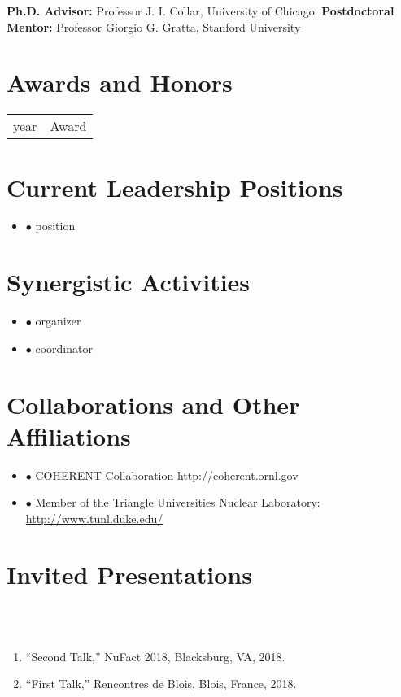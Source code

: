 \documentclass[overlapped,line,letterpaper]{res}
\begin{document}
\begin{resume}
\textbf{Ph.D. Advisor: } Professor J. I. Collar, University of Chicago.
\textbf{Postdoctoral Mentor:} Professor Giorgio G. Gratta, Stanford University


\section{\textbf{Awards and Honors}}
\begin{tabular}{p{1in}p{4.75in}}
year & Award\\
\end{tabular}

%
\section{\textbf{Current Leadership Positions}}
\begin{itemize}
\item $\bullet$  position
\end{itemize}

\section{\textbf{\normalsize Synergistic Activities}}
\begin{itemize}
\item $\bullet$ organizer
\item $\bullet$ coordinator
\end{itemize}
\section{\textbf{Collaborations and Other Affiliations}}
\begin{itemize}
\item $\bullet$ COHERENT Collaboration \url{http://coherent.ornl.gov}
\item $\bullet$ Member of the Triangle Universities Nuclear Laboratory: \url{http://www.tunl.duke.edu/}
\end{itemize}
%

\newpage
\section{\textbf{Invited Presentations}}
~\\
\\
\begin{enumerate}
\item ``Second Talk,'' NuFact 2018, Blacksburg, VA, 2018.
\item ``First Talk,'' Rencontres de Blois, Blois, France, 2018.



\end{enumerate}
\end{resume}
\end{document}
